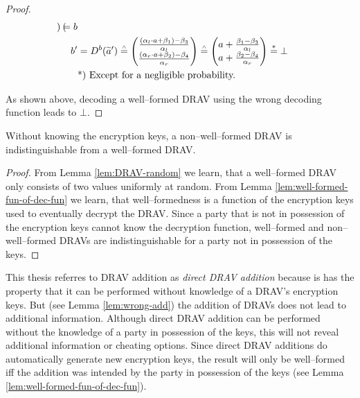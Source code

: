 \begin{proof}
\begin{align*}
\begin{pmatrix}
    \end{pmatrix}
    = b\\
    b' &= D^b(\widetilde{a}')
    \stackrel{\scriptscriptstyle\wedge}{=}
    \begin{pmatrix}
      \frac{(\alpha_l \cdot a + \beta_1) - \beta_3}{\alpha_l}\\
      \frac{(\alpha_r \cdot a + \beta_2) - \beta_4}{\alpha_r}\\
    \end{pmatrix}
    \stackrel{\scriptscriptstyle\wedge}{=}
    \begin{pmatrix}
      a +
      \frac{\beta_1 - \beta_3}{\alpha_l}\\
      a +
      \frac{\beta_2 - \beta_4}{\alpha_r}\\
    \end{pmatrix}
    \stackrel{*}{=} \bot\\
    &\text{*) Except for a negligible probability.}{}
  \end{align*}

  \noindent{}As shown above, decoding a well--formed DRAV using the wrong
  decoding function leads to $\bot$.

\end{proof}


\begin{lem}
  \label{lem:DRAV-indistinguishable}

  Without knowing the encryption keys, a non--well--formed DRAV is
  indistinguishable from a well--formed DRAV\@.

\end{lem}
\begin{proof}

  From Lemma \ref{lem:DRAV-random} we learn, that a well--formed DRAV only
  consists of two values uniformly at random. From Lemma
  \ref{lem:well-formed-fun-of-dec-fun} we learn, that well--formedness is a
  function of the encryption keys used to eventually decrypt the DRAV\@. Since a
  party that is not in possession of the encryption keys cannot know the
  decryption function, well--formed and non--well--formed DRAVs are
  indistinguishable for a party not in possession of the keys.

\end{proof}


\label{sec:DRAV-addition}

This thesis referres to DRAV addition as \emph{direct DRAV addition} because is
has the property that it can be performed without knowledge of a DRAV's
encryption keys. But (see Lemma \ref{lem:wrong-add}) the addition of DRAVs does
not lead to additional information. Although direct DRAV addition can be
performed without the knowledge of a party in possession of the keys, this will
not reveal additional information or cheating options. Since direct DRAV
additions do automatically generate new encryption keys, the result will only be
well--formed iff the addition was intended by the party in possession of the
keys (see Lemma \ref{lem:well-formed-fun-of-dec-fun}).

